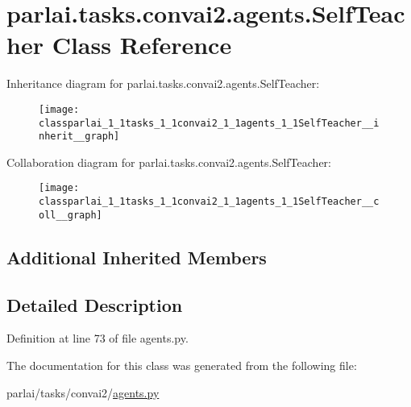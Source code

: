 \hypertarget{classparlai_1_1tasks_1_1convai2_1_1agents_1_1SelfTeacher}{}\section{parlai.\+tasks.\+convai2.\+agents.\+Self\+Teacher Class Reference}
\label{classparlai_1_1tasks_1_1convai2_1_1agents_1_1SelfTeacher}


Inheritance diagram for parlai.\+tasks.\+convai2.\+agents.\+Self\+Teacher\+:
\nopagebreak
\begin{figure}[H]
\begin{center}
\leavevmode
\texttt{[image: classparlai\_1\_1tasks\_1\_1convai2\_1\_1agents\_1\_1SelfTeacher\_\_inherit\_\_graph]}
\end{center}
\end{figure}


Collaboration diagram for parlai.\+tasks.\+convai2.\+agents.\+Self\+Teacher\+:
\nopagebreak
\begin{figure}[H]
\begin{center}
\leavevmode
\texttt{[image: classparlai\_1\_1tasks\_1\_1convai2\_1\_1agents\_1\_1SelfTeacher\_\_coll\_\_graph]}
\end{center}
\end{figure}
\subsection*{Additional Inherited Members}


\subsection{Detailed Description}


Definition at line 73 of file agents.\+py.



The documentation for this class was generated from the following file\+:\begin{DoxyCompactItemize}
\item 
parlai/tasks/convai2/\hyperlink{parlai_2tasks_2convai2_2agents_8py}{agents.\+py}\end{DoxyCompactItemize}
